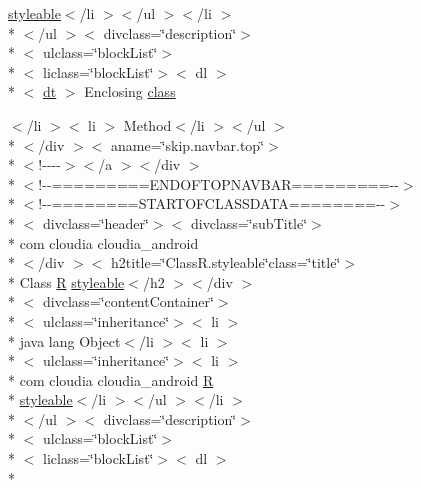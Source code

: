 \begin{DoxyCompactItemize}
\hyperlink{index-17_8html_ae6c9bf1e41380184b4b665ca9ab6ba0a}{styleable}$<$/li $>$$<$/ul $>$$<$/li $>$\\*
$<$/ul $>$$<$ divclass=\char`\"{}description\char`\"{}$>$\\*
$<$ ulclass=\char`\"{}block\-List\char`\"{}$>$\\*
$<$ liclass=\char`\"{}block\-List\char`\"{}$>$$<$ dl $>$\\*
$<$ \hyperlink{stylesheet_8css_a107565fb4039d33b041380d6e0ea1d80}{dt} $>$ Enclosing \hyperlink{_r_8styleable_8html_a245e4c015a18fd4212e4de3bca08ee45}{class}
\item 
$<$/li $>$$<$ li $>$ Method$<$/li $>$$<$/ul $>$\\*
$<$/div $>$$<$ aname=\char`\"{}skip.\-navbar.\-top\char`\"{}$>$\\*
$<$!-\/-\/-\/-\/$>$$<$/a $>$$<$/div $>$\\*
$<$!-\/-\/=========E\-N\-D\-O\-F\-T\-O\-P\-N\-A\-V\-B\-A\-R=========-\/-\/$>$\\*
$<$!-\/-\/========S\-T\-A\-R\-T\-O\-F\-C\-L\-A\-S\-S\-D\-A\-T\-A========-\/-\/$>$\\*
$<$ divclass=\char`\"{}header\char`\"{}$>$$<$ divclass=\char`\"{}sub\-Title\char`\"{}$>$\\*
 com cloudia cloudia\-\_\-android\\*
$<$/div $>$$<$ h2title=\char`\"{}Class\-R.\-styleable\char`\"{}class=\char`\"{}title\char`\"{}$>$\\*
 Class \hyperlink{index-16_8html_a31e8fe59be5c20ce90a0090e28a0c1fe}{R} \hyperlink{index-17_8html_ae6c9bf1e41380184b4b665ca9ab6ba0a}{styleable}$<$/h2 $>$$<$/div $>$\\*
$<$ divclass=\char`\"{}content\-Container\char`\"{}$>$\\*
$<$ ulclass=\char`\"{}inheritance\char`\"{}$>$$<$ li $>$\\*
 java lang Object$<$/li $>$$<$ li $>$\\*
$<$ ulclass=\char`\"{}inheritance\char`\"{}$>$$<$ li $>$\\*
 com cloudia cloudia\-\_\-android \hyperlink{index-16_8html_a31e8fe59be5c20ce90a0090e28a0c1fe}{R} \\*
\hyperlink{index-17_8html_ae6c9bf1e41380184b4b665ca9ab6ba0a}{styleable}$<$/li $>$$<$/ul $>$$<$/li $>$\\*
$<$/ul $>$$<$ divclass=\char`\"{}description\char`\"{}$>$\\*
$<$ ulclass=\char`\"{}block\-List\char`\"{}$>$\\*
$<$ liclass=\char`\"{}block\-List\char`\"{}$>$$<$ dl $>$\\*
$$
\end{DoxyCompactItemize}

